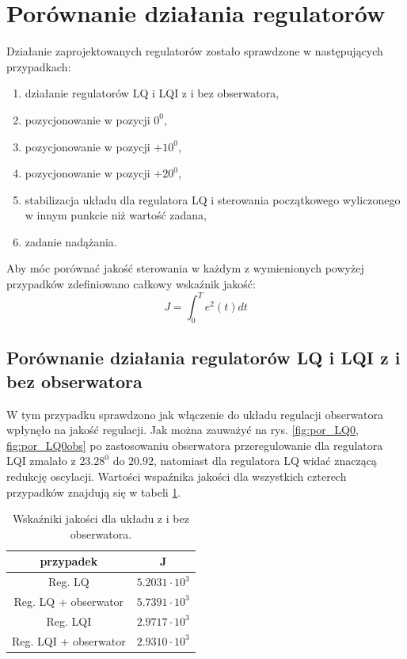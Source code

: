 \documentclass[11pt,a4paper]{article}
\begin{document}
\newpage
\section{Porównanie działania regulatorów}

Działanie zaprojektowanych regulatorów zostało sprawdzone w następujących przypadkach: 
\begin{enumerate}
	\item działanie regulatorów LQ i LQI z i bez obserwatora,
	\item pozycjonowanie w pozycji $0^0$,
	\item pozycjonowanie w pozycji $+10^0$,
	\item pozycjonowanie w pozycji $+20^0$,
	\item stabilizacja układu dla regulatora LQ i sterowania początkowego wyliczonego w innym punkcie niż wartość zadana,
	\item zadanie nadążania.
\end{enumerate}
Aby móc porównać jakość sterowania w każdym z wymienionych powyżej przypadków zdefiniowano całkowy wska\'znik jakość:
\begin{equation}\label{key}
J =\int_{0}^{T} e^2(t) dt
\end{equation}

\subsection{Porównanie działania regulatorów LQ i LQI z i bez obserwatora}
W tym przypadku sprawdzono jak włączenie do układu regulacji obserwatora wpłynęło na jakość regulacji. Jak można zauważyć na rys. \ref{fig:por_LQ0, fig:por_LQ0obs} po zastosowaniu obserwatora przeregulowanie dla regulatora LQI zmalało z $23.28 ^0$ do $ 20.92$, natomiast dla regulatora LQ widać znaczącą redukcję oscylacji. Wartości wspa\'znika jakości dla wszystkich czterech przypadków znajdują się w tabeli \ref{obs_por_tab}.

\begin{table}[h]
	\caption{Wska\'zniki jakości dla układu z i bez obserwatora.}
	\label{obs_por_tab}
	\centering
	
	\begin{tabular}{|c|c|}
		\hline
		przypadek &J\\
		\hline
		Reg. LQ & $5.2031\cdot 10 ^3$\\
		\hline
		Reg. LQ + obserwator & $5.7391 \cdot 10 ^3$\\
		\hline
		Reg. LQI & $2.9717 \cdot 10 ^3$\\
		\hline
		Reg. LQI + obserwator & $2.9310 \cdot 10 ^3$\\ 
		\hline
	\end{tabular}
\end{table}
\end{document}
